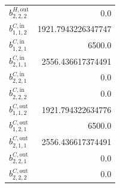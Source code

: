 \documentclass{article}%
\begin{document}
\begin{multicols*}{3}
\begin{supertabular}{lr}
	$b_{2,2,2}^{H,\text{out}}$ & 0.0 \\%
	$b_{1,1,2}^{C,\text{in}}$ & 1921.7943226347747 \\%
	$b_{1,2,1}^{C,\text{in}}$ & 6500.0 \\%
	$b_{2,1,1}^{C,\text{in}}$ & 2556.436617374491 \\%
	$b_{2,2,1}^{C,\text{in}}$ & 0.0 \\%
	$b_{2,2,2}^{C,\text{in}}$ & 0.0 \\%
	$b_{1,1,2}^{C,\text{out}}$ & 1921.794322634776 \\%
	$b_{1,2,1}^{C,\text{out}}$ & 6500.0 \\%
	$b_{2,1,1}^{C,\text{out}}$ & 2556.436617374491 \\%
	$b_{2,2,1}^{C,\text{out}}$ & 0.0 \\%
	$b_{2,2,2}^{C,\text{out}}$ & 0.0 \\%
\end{supertabular}%
\end{multicols*}%
\end{document}
